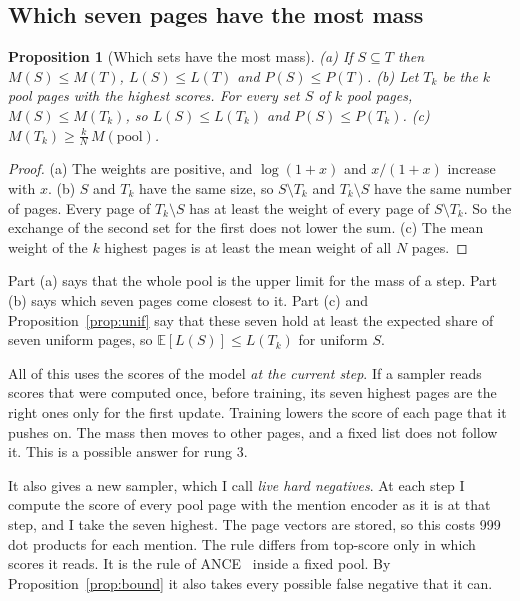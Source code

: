 \documentclass[11pt]{article}
\newtheorem{proposition}{Proposition}
\theoremstyle{definition}
\begin{document}
\subsection{Which seven pages have the most mass}
\label{sec:topmath}

\begin{proposition}[Which sets have the most mass]
\label{prop:top}
(a) If $S \subseteq T$ then $M(S) \le M(T)$, $L(S) \le L(T)$ and $P(S) \le P(T)$.
(b) Let $T_k$ be the $k$ pool pages with the highest scores. For every set $S$ of $k$ pool pages, $M(S) \le M(T_k)$, so $L(S) \le L(T_k)$ and $P(S) \le P(T_k)$.
(c) $M(T_k) \ge \frac{k}{N}\, M(\mathrm{pool})$.
\end{proposition}
\begin{proof}
(a) The weights are positive, and $\log(1 + x)$ and $x/(1 + x)$ increase with $x$. (b) $S$ and $T_k$ have the same size, so $S \setminus T_k$ and $T_k \setminus S$ have the same number of pages. Every page of $T_k \setminus S$ has at least the weight of every page of $S \setminus T_k$. So the exchange of the second set for the first does not lower the sum. (c) The mean weight of the $k$ highest pages is at least the mean weight of all $N$ pages.
\end{proof}

Part (a) says that the whole pool is the upper limit for the mass of a step. Part (b) says which seven pages come closest to it. Part (c) and Proposition~\ref{prop:unif} say that these seven hold at least the expected share of seven uniform pages, so $\mathbb{E}[L(S)] \le L(T_k)$ for uniform $S$.

All of this uses the scores of the model \emph{at the current step}. If a sampler reads scores that were computed once, before training, its seven highest pages are the right ones only for the first update. Training lowers the score of each page that it pushes on. The mass then moves to other pages, and a fixed list does not follow it. This is a possible answer for rung 3.

It also gives a new sampler, which I call \emph{live hard negatives}. At each step I compute the score of every pool page with the mention encoder as it is at that step, and I take the seven highest. The page vectors are stored, so this costs 999 dot products for each mention. The rule differs from top-score only in which scores it reads. It is the rule of ANCE~\cite{xiong2021ance} inside a fixed pool. By Proposition~\ref{prop:bound} it also takes every possible false negative that it can.
\end{document}
